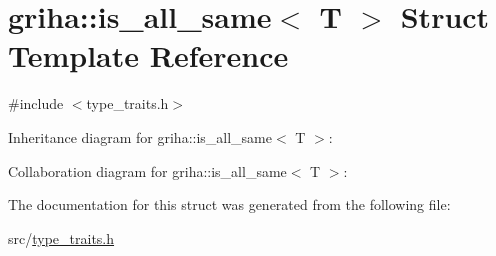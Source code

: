\hypertarget{structgriha_1_1is__all__same_3_01_t_01_4}{}\section{griha\+:\+:is\+\_\+all\+\_\+same$<$ T $>$ Struct Template Reference}
\label{structgriha_1_1is__all__same_3_01_t_01_4}


{\ttfamily \#include $<$type\+\_\+traits.\+h$>$}



Inheritance diagram for griha\+:\+:is\+\_\+all\+\_\+same$<$ T $>$\+:


Collaboration diagram for griha\+:\+:is\+\_\+all\+\_\+same$<$ T $>$\+:


The documentation for this struct was generated from the following file\+:\begin{DoxyCompactItemize}
\item 
src/\hyperlink{type__traits_8h}{type\+\_\+traits.\+h}\end{DoxyCompactItemize}
